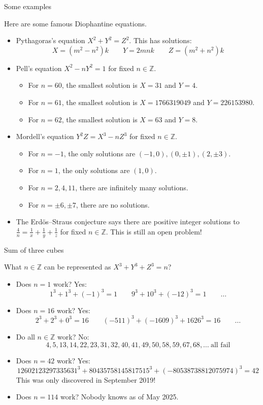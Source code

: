 \documentclass[10pt]{beamer}
\theoremstyle{definition}
\begin{document}
\begin{frame}[t]{Some examples}

Here are some famous Diophantine equations.
\begin{itemize}
\item Pythagoras's equation $ X^2 + Y^2 = Z^2 $. This has solutions:
$$ X = (m^2 - n^2)k \qquad Y = 2mnk \qquad Z = (m^2 + n^2)k $$
\item Pell's equation $ X^2 - nY^2 = 1 $ for fixed $ n \in \mathbb{Z} $.
\begin{itemize}
\item For $ n = 60 $, the smallest solution is $ X = 31 $ and $ Y = 4 $.
\item For $ n = 61 $, the smallest solution is $ X = 1766319049 $ and $ Y = 226153980 $.
\item For $ n = 62 $, the smallest solution is $ X = 63 $ and $ Y = 8 $.
\end{itemize}
\item Mordell's equation $ Y^2Z = X^3 - nZ^3 $ for fixed $ n \in \mathbb{Z} $.
\begin{itemize}
\item For $ n = -1 $, the only solutions are $ (-1, 0), (0, \pm1), (2, \pm3) $.
\item For $ n = 1 $, the only solutions are $ (1, 0) $.
\item For $ n = 2, 4, 11 $, there are infinitely many solutions.
\item For $ n = \pm6, \pm7 $, there are no solutions.
\end{itemize}
\item The Erd\"os--Straus conjecture says there are positive integer solutions to $ \tfrac{4}{n} = \tfrac{1}{x} + \tfrac{1}{y} + \tfrac{1}{z} $ for fixed $ n \in \mathbb{Z} $. This is still an open problem!
\end{itemize}

\end{frame}

\begin{frame}[t]{Sum of three cubes}

What $ n \in \mathbb{Z} $ can be represented as $ X^3 + Y^3 + Z^3 = n $?
\begin{itemize}
\item Does $ n = 1 $ work? Yes:
$$ 1^3 + 1^3 + (-1)^3 = 1 \qquad 9^3 + 10^3 + (-12)^3 = 1 \qquad \dots $$
\item Does $ n = 16 $ work? Yes:
$$ 2^3 + 2^3 + 0^3 = 16 \qquad (-511)^3 + (-1609)^3 + 1626^3 = 16 \qquad \dots $$
\item Do all $ n \in \mathbb{Z} $ work? No:
$$ 4, 5, 13, 14, 22, 23, 31, 32, 40, 41, 49, 50, 58, 59, 67, 68, \dots \ \text{all fail} $$
\item Does $ n = 42 $ work? Yes:
{\footnotesize $$ 12602123297335631^3 + 80435758145817515^3 + (-80538738812075974)^3 = 42 $$}%
This was only discovered in September 2019!
\item Does $ n = 114 $ work? Nobody knows as of May 2025.
\end{itemize}

\end{frame}
\end{document}
